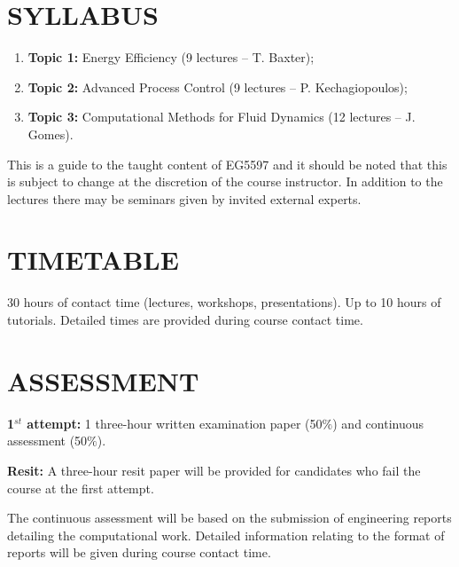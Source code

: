 \documentclass[12pts,a4paper,amsmath,amssymb,floatfix]{article}%
\begin{document}
\section{SYLLABUS}
\begin{enumerate}[{\bf 1.}]
\item {\bf Topic 1:} Energy Efficiency (9 lectures -- T. Baxter);
\item {\bf Topic 2:} Advanced Process Control (9 lectures -- P. Kechagiopoulos);
\item {\bf Topic 3:} Computational Methods for Fluid Dynamics (12 lectures -- J. Gomes).
\end{enumerate}

\medskip
This is a guide to the taught content of EG5597 and it should be noted that this is subject to change at the discretion of the course instructor. In addition to the lectures there may be seminars given by invited external experts.


\section{TIMETABLE}
30 hours of contact time (lectures, workshops, presentations). Up to 10 hours of tutorials. Detailed times are provided during course contact time. %


\section{ASSESSMENT}

{\bf 1$^{st}$ attempt:} 1 three-hour written examination paper (50$\%$) and continuous assessment (50$\%$). 

{\bf Resit:} A three-hour resit paper will be provided for candidates who fail the course at the first attempt. 

\medskip

The continuous assessment will be based on the submission of engineering reports detailing the computational work. Detailed information relating to the format of reports will be given during course contact time.

\medskip
\end{document}
